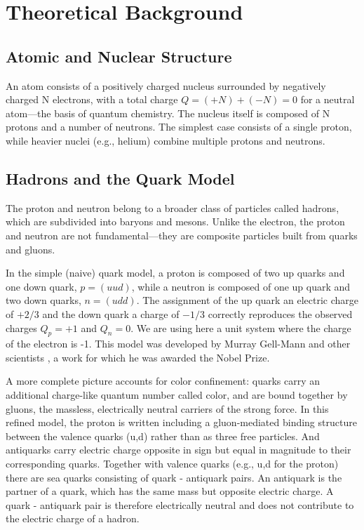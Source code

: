 \documentclass{article}
\begin{document}
\section{Theoretical Background}
\label{sec:theoretical_background}

\subsection{Atomic and Nuclear Structure}
\par An atom consists of a positively charged nucleus surrounded by negatively charged N electrons, with a total charge $Q = (+N) + (-N) = 0$ for a neutral atom---the basis of quantum chemistry. The nucleus itself is composed of N protons and a number of neutrons. The simplest case consists of a single proton, while heavier nuclei (e.g., helium) combine multiple protons and neutrons.

\subsection{Hadrons and the Quark Model}
\label{ssec:hadrons&quark}
\par The proton and neutron belong to a broader class of particles called hadrons, which are subdivided into baryons and mesons. Unlike the electron, the proton and neutron are not fundamental---they are composite particles built from quarks and gluons.
\par In the simple (naive) quark model, a proton is composed of two up quarks and one down quark, $p = (uud)$, while a neutron is composed of one up quark and two down quarks, $n = (udd)$. The assignment of the up quark an electric charge of $+2/3$ and the down quark a charge of $-1/3$ \cite{pdg2024} correctly reproduces the observed charges $Q_p = +1$ and $Q_n = 0$. We are using here a unit system where the charge of the electron is -1. This model was developed by Murray Gell-Mann and other scientists \cite{gellmann1964}, a work for which he was awarded the Nobel Prize.
\par A more complete picture accounts for color confinement: quarks carry an additional charge-like quantum number called color, and are bound together by gluons, the massless, electrically neutral carriers of the strong force. In this refined model, the proton is written including a gluon-mediated binding structure between the valence quarks (u,d) rather than as three free particles. And antiquarks carry electric charge opposite in sign but equal in magnitude to their corresponding quarks. Together with valence quarks (e.g., u,d for the proton) there are sea quarks consisting of quark - antiquark pairs. An antiquark is the partner of a quark, which has the same mass but opposite electric charge. A quark - antiquark pair is therefore electrically neutral and does not contribute to the electric charge of a hadron.
\end{document}
